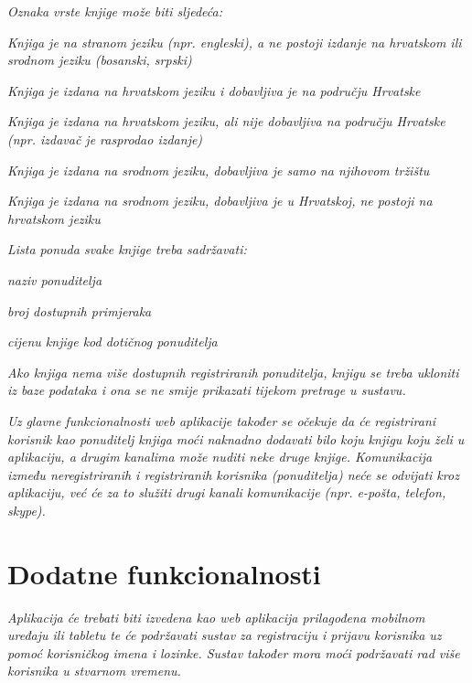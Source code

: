 	\pagebreak
		
	\textit{Oznaka vrste knjige može biti sljedeća:}
	
	\begin{packed_item}
		\item \textit {Knjiga je na stranom jeziku (npr. engleski), a ne postoji izdanje na hrvatskom ili srodnom jeziku (bosanski, srpski)}
		\item \textit {Knjiga je izdana na hrvatskom jeziku i dobavljiva je na području Hrvatske}
		\item \textit {Knjiga je izdana na hrvatskom jeziku, ali nije dobavljiva na području Hrvatske (npr. izdavač je rasprodao izdanje)}
		\item \textit {Knjiga je izdana na srodnom jeziku, dobavljiva je samo na njihovom tržištu}
		\item \textit {Knjiga je izdana na srodnom jeziku, dobavljiva je u Hrvatskoj, ne postoji na hrvatskom jeziku}
	\end{packed_item}
	
	\textit{Lista ponuda svake knjige treba sadržavati:}
	
	\begin{packed_item}
		\item \textit {naziv ponuditelja}
		\item \textit {broj dostupnih primjeraka}
		\item \textit {cijenu knjige kod dotičnog ponuditelja}
	\end{packed_item}
	
	\textit{Ako knjiga nema više dostupnih registriranih ponuditelja, knjigu se treba ukloniti iz baze podataka i ona se ne smije prikazati tijekom pretrage u sustavu.}
	
	\textit{Uz glavne funkcionalnosti web aplikacije također se očekuje da će registrirani korisnik kao ponuditelj knjiga moći naknadno dodavati bilo koju knjigu koju želi u aplikaciju, a drugim kanalima može nuditi neke druge knjige. Komunikacija između neregistriranih i registriranih korisnika (ponuditelja) neće se odvijati kroz aplikaciju, već će za to služiti drugi kanali komunikacije (npr. e-pošta, telefon, skype).}
	
	\section{Dodatne funkcionalnosti}
	
	\textit{Aplikacija će trebati biti izvedena kao web aplikacija prilagođena mobilnom uređaju ili tabletu te će podržavati sustav za registraciju i prijavu korisnika uz pomoć korisničkog imena i lozinke. Sustav također mora moći podržavati rad više korisnika u stvarnom vremenu.}
				
